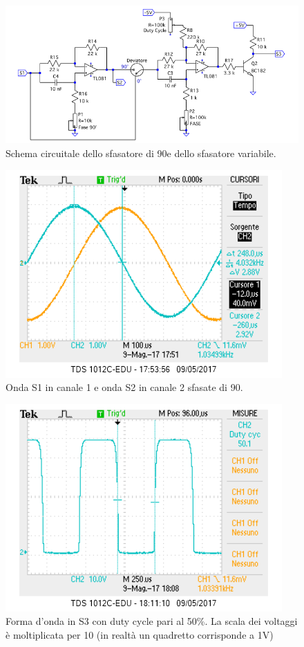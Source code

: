 \documentclass[10pt,a4paper]{article}
\begin{document}
 

\begin{figure}[!htb]
  \centering
  \includegraphics[scale=0.75]{sfasatori.png}
\caption{Schema circuitale dello sfasatore di 90\degree e dello sfasatore variabile.\label{fig:sfasatori}}
\end{figure}

\begin{figure}[!htb]
  \centering
  \includegraphics[scale=0.75]{sfasamento90.png}
\caption{Onda S1 in canale 1 e onda S2 in canale 2 sfasate di 90\degree.\label{osc:sfasamento}}
\end{figure}

\begin{figure}[!htb]
\centering
  \includegraphics[scale=0.75]{dutycycle50.png}
\caption{Forma d'onda in S3 con duty cycle pari al 50\%. La scala dei voltaggi è moltiplicata per 10 (in realtà un quadretto corrisponde a 1V) 
\label{osc:duty}}
\end{figure}
\end{document}
